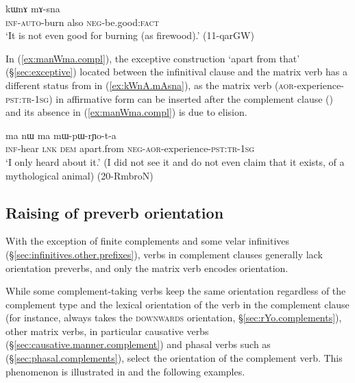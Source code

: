 \begin{exe}
\ex \label{ex:kWnA.mAsna2}
\gll [kɤ-nɯ-βlɯ] kɯnɤ mɤ-sna \\
\textsc{inf}-\textsc{auto}-burn also \textsc{neg}-be.good:\textsc{fact} \\
\glt `It is not even good for burning (as firewood).' (11-qarGW)
\end{exe}

In (\ref{ex:manWma.compl}),  the exceptive construction  `apart from that' (§\ref{sec:exceptive})  located between the infinitival clause  and the matrix verb has a different status from  in (\ref{ex:kWnA.mAsna}), as the matrix verb  (\textsc{aor}-experience-\textsc{pst}:\textsc{tr}-\textsc{1sg}) in affirmative form can be inserted after the complement clause () and its absence in (\ref{ex:manWma.compl}) is due to elision.

\begin{exe}
\ex \label{ex:manWma.compl}
\gll  [kɤ-mtsʰɤm] ma nɯ ma mɯ-pɯ-rɲo-t-a \\
\textsc{inf}-hear \textsc{lnk} \textsc{dem} apart.from \textsc{neg}-\textsc{aor}-experience-\textsc{pst}:\textsc{tr}-\textsc{1sg} \\
\glt `I only heard about it.' (I did not see it and do not even claim that it exists, of a mythological animal) (20-RmbroN)
\end{exe}

\subsection{Raising of preverb orientation} \label{sec:orientation.raising}
With the exception of finite complements and some velar infinitives (§\ref{sec:infinitives.other.prefixes}), verbs in complement clauses generally lack orientation preverbs, and only the matrix verb encodes orientation.

While some com\-ple\-ment-taking verbs keep the same orientation regardless of the complement type and the lexical orientation of the verb in the complement clause (for instance,  always takes the \textsc{downwards} orientation, §\ref{sec:rYo.complements}), other matrix verbs, in particular causative verbs (§\ref{sec:causative.manner.complement}) and phasal verbs such as    (§\ref{sec:phasal.complements}), select the orientation of the complement verb. This phenomenon is illustrated in  and the following examples.


